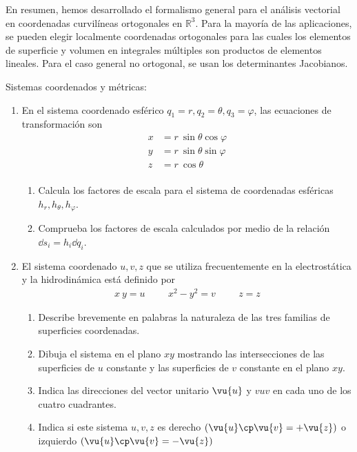 En resumen, hemos desarrollado el formalismo general para el análisis vectorial en coordenadas curvilíneas ortogonales en $\mathbb{R}^{3}$. Para la mayoría de las aplicaciones, se pueden elegir localmente coordenadas ortogonales para las cuales los elementos de superficie y volumen en integrales múltiples son productos de elementos lineales. Para el caso general no ortogonal, se usan los determinantes Jacobianos.
\begin{ejer}{Sistemas coordenados y métricas:}
\begin{enumerate}
\item En el sistema coordenado esférico $q_{1} = r, q_{2} = \theta, q_{3} = \varphi$, las ecuaciones de transformación son
\begin{align*}
x &= r \: \sin \theta \cos \varphi \\
y &= r \: \sin \theta \sin \varphi \\
z &= r \: \cos \theta \\
\end{align*}
\begin{enumerate}[label=(\alph*)]
\item Calcula los factores de escala para el sistema de coordenadas esféricas $h_{r}, h_{\theta}, h_{\varphi}$.
\item Comprueba los factores de escala calculados por medio de la relación $\dd{s}_{i} = h_{i} \dd{q}_{i}$.
\end{enumerate}
\item El sistema coordenado $u, v, z$ que se utiliza frecuentemente en la electrostática y la hidrodinámica está definido por
\begin{align*}
x \: y = u \hspace{1cm} x^{2} - y^{2} = v \hspace{1cm} z = z
\end{align*}
\begin{enumerate}[label=(\alph*)]
\item Describe brevemente en palabras la naturaleza de las tres familias de superficies coordenadas.
\item Dibuja el sistema en el plano $xy$ mostrando las intersecciones de las superficies de $u$ constante y las superficies de $v$ constante en el plano $xy$.
\item Indica las direcciones del vector unitario $\vu{u}$ y $vu{v}$ en cada uno de los cuatro cuadrantes.
\item Indica si este sistema $u, v, z$ es derecho $(\vu{u} \cp \vu{v} = + \vu{z} )$ o izquierdo $(\vu{u} \cp \vu{v} = - \vu{z} )$

\end{enumerate}
\end{enumerate}
\end{ejer}
